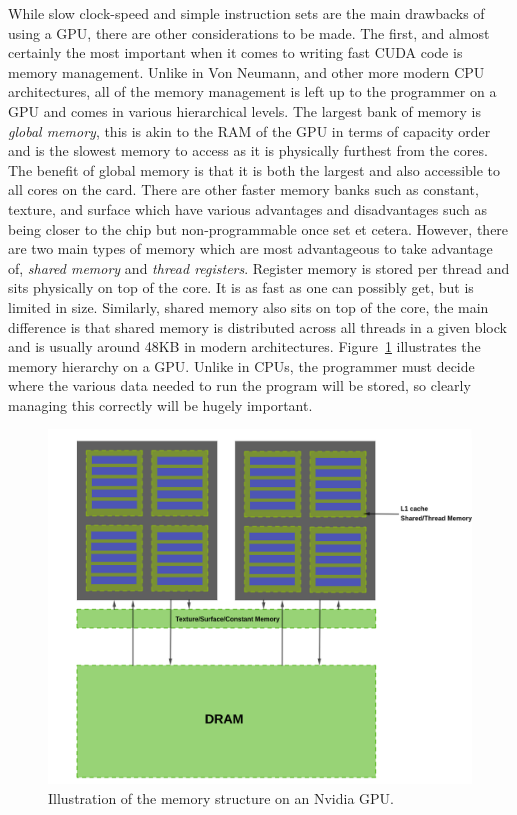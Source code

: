 While slow clock-speed and simple instruction sets are the main drawbacks of using a GPU, there are other considerations to be made. The first, and almost certainly the most important when it comes to writing fast CUDA code is memory management. Unlike in Von Neumann, and other more modern CPU architectures, all of the memory management is left up to the programmer on a GPU and comes in various hierarchical levels. The largest bank of memory is \textit{global memory}, this is akin to the RAM of the GPU in terms of capacity order and is the slowest memory to access as it is physically furthest from the cores. The benefit of global memory is that it is both the largest and also accessible to all cores on the card. There are other faster memory banks such as constant, texture, and surface which have various advantages and disadvantages such as being closer to the chip but non-programmable once set et cetera. However, there are two main types of memory which are most advantageous to take advantage of, \textit{shared memory} and \textit{thread registers}. Register memory is stored per thread and sits physically on top of the core. It is as fast as one can possibly get, but is limited in size. Similarly, shared memory also sits on top of the core, the main difference is that shared memory is distributed across all threads in a given block and is usually around 48KB in modern architectures. Figure~\ref{fig:mem} illustrates the memory hierarchy on a GPU. Unlike in CPUs, the programmer must decide where the various data needed to run the program will be stored, so clearly managing this correctly will be hugely important.

\begin{figure}
	\centering
	\includegraphics[width=0.8\linewidth]{Figures/mem_arch}
	\caption{Illustration of the memory structure on an Nvidia GPU.}
	\label{fig:mem}
\end{figure}

